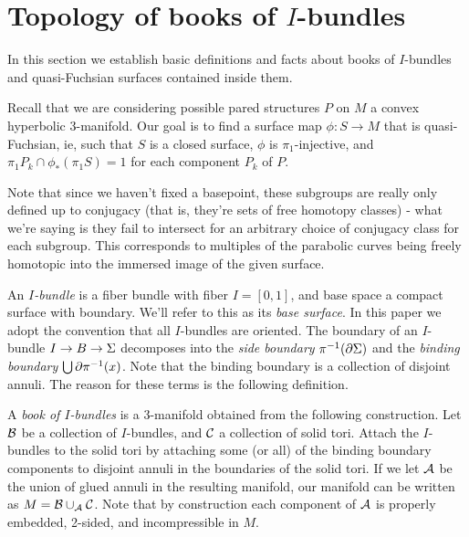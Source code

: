 \section{Topology of books of $I$-bundles}

In this section we establish basic definitions and facts about books of
$I$-bundles and quasi-Fuchsian surfaces contained inside them.

Recall that we are considering possible pared structures $P$ on $M$ a convex
hyperbolic 3-manifold. Our goal is to find a surface map $\phi \colon S \to M$
that is quasi-Fuchsian, ie, such that $S$ is a closed surface, $\phi$ is
$\pi_1$-injective, and $\pi_1P_k \cap \phi_*(\pi_1S) = 1$ for each component
$P_k$ of $P$.

Note that since we haven't fixed a basepoint, these subgroups are really only
defined up to conjugacy (that is, they're sets of free homotopy classes) - what
we're saying is they fail to intersect for an arbitrary choice of conjugacy
class for each subgroup. This corresponds to multiples of the parabolic curves
being freely homotopic into the immersed image of the given surface.

\begin{defn}

An \emph{$I$-bundle} is a fiber bundle with fiber $I=[0,1]$, and base space
a compact surface with boundary. We'll refer to this as its \emph{base
surface}.  In this paper we adopt the convention that all $I$-bundles are
oriented.  The boundary of an $I$-bundle $I \to B \to \Sigma$ decomposes into the
\emph{side boundary} $\pi^{-1}(\partial \Sigma)$ and the \emph{binding boundary}
$\bigcup \partial \pi^{-1}(x)$. Note that the binding boundary is a collection of
disjoint annuli. The reason for these terms is the following definition.

A \emph{book of $I$-bundles} is a 3-manifold obtained from the following
construction. Let $\mathcal{B}$ be a collection of $I$-bundles, and $\mathcal{C}$ a collection
of solid tori. Attach the $I$-bundles to the solid tori by attaching some (or
all) of the binding boundary components to disjoint annuli in the boundaries of
the solid tori.  If we let $\mathcal{A}$ be the union of glued annuli in the resulting
manifold, our manifold can be written as $M=\mathcal{B} \cup_{\mathcal{A}} \mathcal{C}$. Note that by
construction each component of $\mathcal{A}$ is properly embedded, 2-sided, and
incompressible in $M$.

\end{defn}

